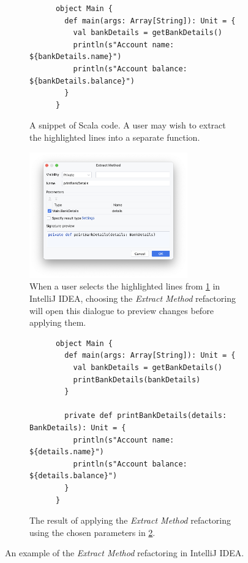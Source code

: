 \documentclass[../../main.tex]{subfiles}
\begin{document}
\begin{figure}[htbp]
  \centering
  \begin{subfigure}{\textwidth}
    \centering
    \begin{verbatim}
      object Main {
        def main(args: Array[String]): Unit = {
          val bankDetails = getBankDetails()
          println(s"Account name: ${bankDetails.name}")
          println(s"Account balance: ${bankDetails.balance}")
        }
      }
    \end{verbatim}
    \caption{A snippet of Scala code. A user may wish to extract the highlighted lines into a separate function.}
    \label{fig:extract-function-intellij-before}
  \end{subfigure}
  \begin{subfigure}{\textwidth}
    \centering
    \includegraphics[width=0.75\textwidth]{src/background/extract-function-intellij.png}
    \caption{When a user selects the highlighted lines from \cref{fig:extract-function-intellij-before} in IntelliJ IDEA, choosing the \emph{Extract Method} refactoring will open this dialogue to preview changes before applying them.}
    \label{fig:extract-function-intellij-dialogue}
  \end{subfigure}
  \begin{subfigure}{\textwidth}
    \vspace{3ex} %
    \centering
    \begin{verbatim}
      object Main {
        def main(args: Array[String]): Unit = {
          val bankDetails = getBankDetails()
          printBankDetails(bankDetails)
        }

        private def printBankDetails(details: BankDetails): Unit = {
          println(s"Account name: ${details.name}")
          println(s"Account balance: ${details.balance}")
        }
      }
    \end{verbatim}
    \caption{The result of applying the \emph{Extract Method} refactoring using the chosen parameters in \cref{fig:extract-function-intellij-dialogue}.}
  \end{subfigure}
  \caption{An example of the \emph{Extract Method} refactoring in IntelliJ IDEA.}
  \label{fig:extract-function-intellij}
\end{figure}
\end{document}
